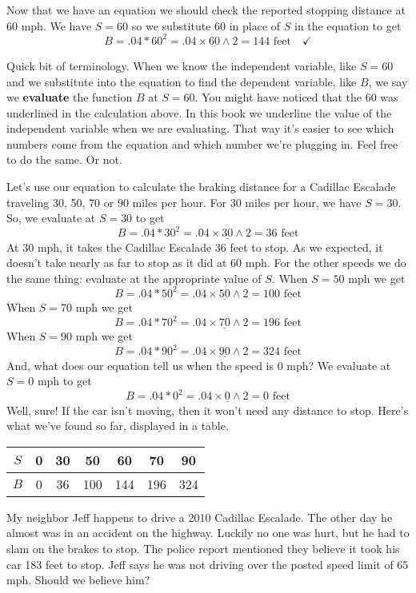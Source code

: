 Now that we have an equation we should check the reported stopping distance at 60 mph. We have $S=60$ so we substitute 60 in place of $S$ in the equation to get 
$$B = .04 \ast 60^2 = .04 \times \underline{60} \wedge 2 = 144 \text{ feet} \quad \checkmark$$

Quick bit of terminology.  When we know the independent variable, like $S=60$ and we substitute into the equation to find the dependent variable, like $B$, we say we \textbf{evaluate} the function $B$ at $S=60$.  You might have noticed that the 60 was underlined in the calculation above.  In this book we underline the value of the independent variable when we are evaluating.  That way it's easier to see which numbers come from the equation and which number we're plugging in. Feel free to do the same.  Or not.

Let's use our equation to calculate the braking distance for a Cadillac Escalade traveling 30, 50, 70 or 90 miles per hour.  For 30 miles per hour, we have $S=30$.  So, we evaluate at $S=30$  to get 
$$B = .04 \ast 30^2 = .04\times \underline{30} \wedge 2 = 36 \text{ feet}$$  
At 30 mph, it takes the Cadillac Escalade 36 feet to stop.  As we expected, it doesn't take nearly as far to stop as it did at 60 mph. 
For the other speeds we do the same thing:  evaluate at the appropriate value of  $S$.  When  $S=50$ mph we get
$$B = .04 \ast 50^2 = .04\times \underline{50}\wedge2 = 100 \text{ feet}$$ 
When $S=70$ mph we get
$$B = .04 \ast 70^2 = .04\times \underline{70}\wedge2 = 196\text{ feet}$$ 
When $S=90$ mph we get
$$B = .04 \ast 90^2 = .04\times \underline{90}\wedge2 = 324 \text{ feet}$$ 
And, what does our equation tell us when the speed is 0 mph?  We evaluate at $S=0$ mph to get  $$B = .04 \ast 0^2 = .04\times \underline{0} \wedge 2 = 0 \text{ feet}$$ 
Well, sure!  If the car isn't moving, then it won't need any distance to stop.
Here's what we've found so far, displayed in a table.
\begin{center}
\begin{tabular} {|c| |c|c |c|c|c |c|} \hline
$S$ & 0 & 30 & 50 & 60 & 70 & 90 \\ \hline
$B$ & 0 & 36 & 100 & 144 & 196 & 324 \\ \hline
\end{tabular}
\end{center}

My neighbor Jeff happens to drive a 2010 Cadillac Escalade.  The other day he almost was in an accident on the highway.  Luckily no one was hurt, but he had to slam on the brakes to stop.  The police report mentioned they believe it took his car 183 feet to stop.  Jeff says he was not driving over the posted speed limit of 65 mph.  Should we believe him?

